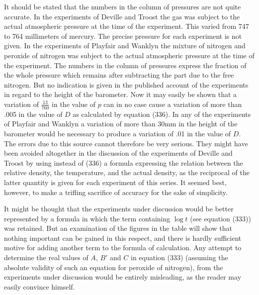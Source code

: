 \documentclass[12pt]{memoir}
\begin{document}
It should be stated that the numbers in the column of pressures are not quite accurate.  In the experiments of Deville and Troost the gas was subject to the actual atmospheric pressure at the time of the experiment. This varied from 747 to 764 millimeters of mercury. The precise pressure for each experiment is not given. In the experiments of Playfair and Wanklyn the mixture of nitrogen and peroxide of nitrogen was subject to the actual atmospheric pressure at the time of the experiment. The numbers in the column of pressures express the fraction of the whole pressure which remains after subtracting the part due to the free nitrogen. But no indication is given in the published account of the experiments in regard to the height of the barometer. Now it may easily be shown that a variation of $\frac{13}{760}$ in the value of $p$ can in no case cause a variation of more than .005 in the value of $D$ as calculated by equation (336). In any of the experiments of Playfair and Wanklyn a variation of more than 30mm in the height of the barometer would be necessary to produce a variation of .01 in the value of $D$. The errors due to this source cannot therefore be very serious. They might have been avoided altogether in the discussion of the experiments of Deville and Troost by using instead of (336) a formula expressing the relation between the relative density, the temperature, and the actual density, as the reciprocal of the latter quantity is given for each experiment of this series. It seemed best, however, to make a trifling sacrifice of accuracy for the sake of simplicity.


It might be thought that the experiments under discussion would be better represented by a formula in which the term containing $\log t$ (see equation (333)) was retained. But an examination of the figures in the table will show that nothing important can be gained in this respect, and there is hardly sufficient motive for adding another term to the formula of calculation.  Any attempt to determine the real values of $A$, $B'$ and $C$ in equation (333) (assuming the absolute validity of such an equation for peroxide of nitrogen), from the experiments under discussion would be entirely misleading, as the reader may easily convince himself.
\end{document}
